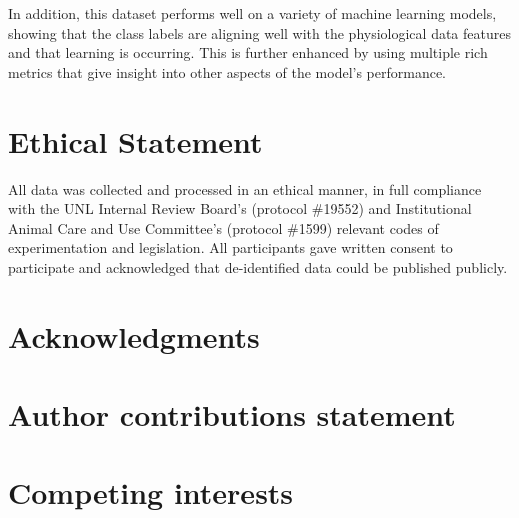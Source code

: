 \documentclass[12pt]{iopart}
\begin{document}
In addition, this dataset performs well on a variety of machine learning models, showing that the class labels are aligning well with the physiological data features and that learning is occurring.  This is further enhanced by using multiple rich metrics that give insight into other aspects of the model's performance.

\section*{Ethical Statement}

All data was collected and processed in an ethical manner, in full compliance with the UNL Internal Review Board's (protocol \#19552) and Institutional Animal Care and Use Committee's (protocol \#1599) relevant codes of experimentation and legislation.  All participants gave written consent to participate and acknowledged that de-identified data could be published publicly. 

\section*{Acknowledgments} 

\section*{Author contributions statement}

\section*{Competing interests} 

\printbibliography %
\end{document}
